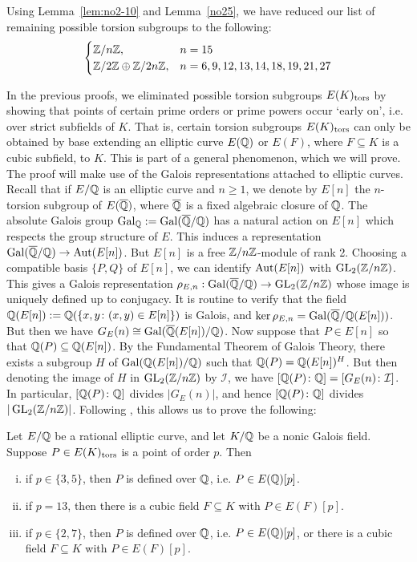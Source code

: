 Using Lemma~\ref{lem:no2-10} and Lemma~\ref{no25}, we have reduced our list of remaining possible torsion subgroups to the following:
	\[
	\begin{cases}
	\mathbb{Z}/n\mathbb{Z}, & n= 15 \\
	\mathbb{Z}/2\mathbb{Z} \oplus \mathbb{Z}/2n\mathbb{Z}, & n= 6, 9, 12, 13, 14, 18, 19, 21, 27
	\end{cases}
	\]


In the previous proofs, we eliminated possible torsion subgroups $E(K)_{\text{tors}}$ by showing that points of certain prime orders or prime powers occur `early on', i.e. over strict subfields of $K$. That is, certain torsion subgroups  $E(K)_{\text{tors}}$ can only be obtained by base extending an elliptic curve $E(\mathbb{Q})$ or $E(F)$, where $F \subseteq K$ is a cubic subfield, to $K$. This is part of a general phenomenon, which we will prove. The proof will make use of the Galois representations attached to elliptic curves. Recall that if $E/\mathbb{Q}$ is an elliptic curve and $n \geq 1$, we denote by $E[n]$ the $n$-torsion subgroup of $E(\overline{\mathbb{Q}})$, where $\overline{\mathbb{Q}}$ is a fixed algebraic closure of $\mathbb{Q}$. The absolute Galois group $\operatorname{Gal}_{\mathbb{Q}}:= \operatorname{Gal}(\overline{\mathbb{Q}}/\mathbb{Q})$ has a natural action on $E[n]$ which respects the group structure of $E$. This induces a representation $\operatorname{Gal}(\overline{\mathbb{Q}}/\mathbb{Q}) \to \operatorname{Aut}(E[n])$. But $E[n]$ is a free $\mathbb{Z}/n\mathbb{Z}$-module of rank 2. Choosing a compatible basis $\{ P, Q \}$ of $E[n]$, we can identify $\operatorname{Aut}(E[n])$ with $\operatorname{GL}_2(\mathbb{Z}/n\mathbb{Z})$. This gives a Galois representation $\rho_{E,n}: \operatorname{Gal}(\overline{\mathbb{Q}}/\mathbb{Q}) \to \operatorname{GL}_2(\mathbb{Z}/n\mathbb{Z})$ whose image is uniquely defined up to conjugacy. It is routine to verify that the field $\mathbb{Q}(E[n]):= \mathbb{Q}(\{ x,y \colon (x,y) \in E[n]\})$ is Galois, and $\ker \rho_{E,n}= \operatorname{Gal}(\overline{\mathbb{Q}}/\mathbb{Q}(E[n]))$. But then we have $G_E(n) \cong \operatorname{Gal}(\overline{\mathbb{Q}}(E[n])/\mathbb{Q})$. Now suppose that $P \in E[n]$ so that $\mathbb{Q}(P) \subseteq \mathbb{Q}(E[n])$. By the Fundamental Theorem of Galois Theory, there exists a subgroup $H$ of $\operatorname{Gal}(\mathbb{Q}(E[n])/\mathbb{Q})$ such that $\mathbb{Q}(P)= \mathbb{Q}(E[n])^H$. But then denoting the image of $H$ in $\operatorname{GL}_2(\mathbb{Z}/n\mathbb{Z})$ by $\mathcal{I}$, we have $[\mathbb{Q}(P) \colon \mathbb{Q}]= [G_E(n) \colon \mathcal{I}]$. In particular, $[\mathbb{Q}(P) \colon \mathbb{Q}]$ divides $|G_E(n)|$, and hence $[\mathbb{Q}(P) \colon \mathbb{Q}]$ divides $|\operatorname{GL}_2(\mathbb{Z}/n\mathbb{Z})|$. Following \cite[Prop.~2.8]{chou16}, this allows us to prove the following:


\begin{prop} \label{prop:noniclimitdegree}
Let $E/\mathbb{Q}$ be a rational elliptic curve, and let $K/\mathbb{Q}$ be a nonic Galois field. Suppose $P \in E(K)_{\text{tors}}$ is a point of order $p$. Then
        \begin{enumerate}[(i)]
        \item if $p \in \{ 3, 5 \}$, then $P$ is defined over $\mathbb{Q}$, i.e. $P \in E(\mathbb{Q})[p]$.
        \item if $p= 13$, then there is a cubic field $F \subseteq K$ with $P \in E(F)[p]$. 
        \item if $p \in \{ 2, 7 \}$, then $P$ is defined over $\mathbb{Q}$, i.e. $P \in E(\mathbb{Q})[p]$, or there is a cubic field $F \subseteq K$ with $P \in E(F)[p]$. 
        \end{enumerate}
\end{prop}

